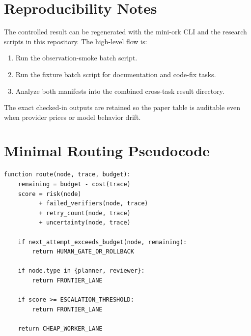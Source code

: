 \documentclass[11pt]{article}
\begin{document}
\appendix

\section{Reproducibility Notes}

The controlled result can be regenerated with the mini-ork CLI and the research
scripts in this repository. The high-level flow is:
\begin{enumerate}
  \item Run the observation-smoke batch script.
  \item Run the fixture batch script for documentation and code-fix tasks.
  \item Analyze both manifests into the combined cross-task result directory.
\end{enumerate}
The exact checked-in outputs are retained so the paper table is auditable even
when provider prices or model behavior drift.

\section{Minimal Routing Pseudocode}

\begin{verbatim}
function route(node, trace, budget):
    remaining = budget - cost(trace)
    score = risk(node)
          + failed_verifiers(node, trace)
          + retry_count(node, trace)
          + uncertainty(node, trace)

    if next_attempt_exceeds_budget(node, remaining):
        return HUMAN_GATE_OR_ROLLBACK

    if node.type in {planner, reviewer}:
        return FRONTIER_LANE

    if score >= ESCALATION_THRESHOLD:
        return FRONTIER_LANE

    return CHEAP_WORKER_LANE
\end{verbatim}



\end{document}
